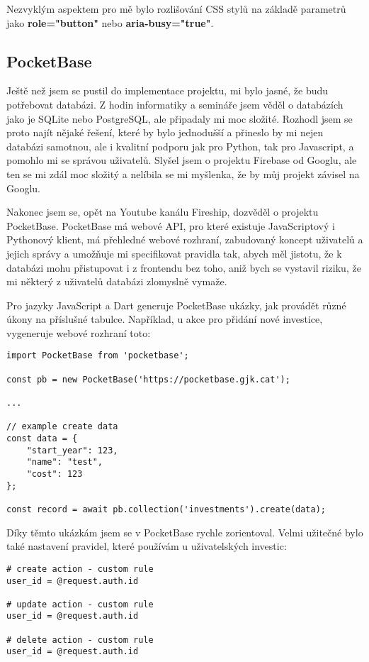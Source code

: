 \documentclass[11pt,a4paper,twoside,openright]{report}
\begin{document}
Nezvyklým aspektem pro mě bylo rozlišování CSS stylů na základě parametrů jako \textbf{role="button"} nebo
\textbf{aria-busy="true"}.

\subsection{PocketBase}
Ještě než jsem se pustil do implementace projektu, mi bylo jasné, že budu potřebovat databázi. Z hodin
informatiky a semináře jsem věděl o databázích jako je SQLite nebo PostgreSQL, ale připadaly mi moc
složité. Rozhodl jsem se proto najít nějaké řešení, které by bylo jednodušší a přineslo by mi nejen databázi
samotnou, ale i kvalitní podporu jak pro Python, tak pro Javascript, a pomohlo mi se správou uživatelů.
Slyšel jsem o projektu Firebase od Googlu, ale ten se mi zdál moc složitý a nelíbila se mi myšlenka,
že by můj projekt závisel na Googlu.

Nakonec jsem se, opět na Youtube kanálu Fireship, dozvěděl o projektu PocketBase. PocketBase má webové API,
pro které existuje JavaScriptový i Pythonový klient, má přehledné webové rozhraní, zabudovaný koncept uživatelů
a jejich správy a umožňuje mi specifikovat pravidla tak, abych měl jistotu, že k databázi mohu přistupovat
i z frontendu bez toho, aniž bych se vystavil riziku, že mi některý z uživatelů databázi zlomyslně vymaže.

Pro jazyky JavaScript a Dart generuje PocketBase ukázky, jak provádět různé úkony na příslušné tabulce.
Například, u akce pro přidání nové investice, vygeneruje webové rozhraní toto:

\begin{verbatim}
import PocketBase from 'pocketbase';

const pb = new PocketBase('https://pocketbase.gjk.cat');

...

// example create data
const data = {
    "start_year": 123,
    "name": "test",
    "cost": 123
};

const record = await pb.collection('investments').create(data);
\end{verbatim}

Díky těmto ukázkám jsem se v PocketBase rychle zorientoval. Velmi užitečné bylo také nastavení pravidel,
které používám u uživatelských investic:

\begin{verbatim}
# create action - custom rule
user_id = @request.auth.id

# update action - custom rule
user_id = @request.auth.id

# delete action - custom rule
user_id = @request.auth.id
\end{verbatim}
\end{document}
